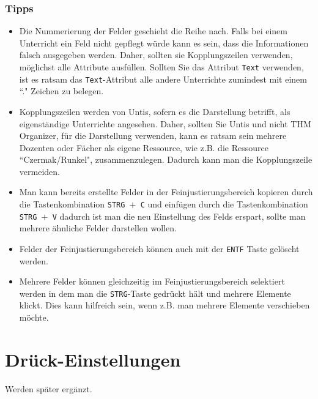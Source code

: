 \subsubsection{Tipps}

\begin{itemize}
	\item Die Nummerierung der Felder geschieht die Reihe nach. Falls bei einem Unterricht ein Feld nicht gepflegt würde kann es sein, dass die Informationen falsch ausgegeben werden. Daher, sollten sie Kopplungszeilen verwenden, möglichst alle Attribute ausfüllen. Sollten Sie das Attribut \texttt{Text} verwenden, ist es ratsam das \texttt{Text}-Attribut alle andere Unterrichte zumindest mit einem ``." \hspace{1pt} Zeichen zu belegen.
	\item Kopplungszeilen werden von Untis, sofern es die Darstellung betrifft, als eigenständige Unterrichte angesehen. Daher, sollten Sie Untis und nicht THM Organizer, für die Darstellung verwenden, kann es ratsam sein mehrere Dozenten oder Fächer als eigene Ressource, wie z.B. die Ressource ``Czermak/Runkel", zusammenzulegen. Dadurch kann man die Kopplungszeile vermeiden.
	\item Man kann bereits erstellte Felder in der Feinjustierungsbereich kopieren durch die Tastenkombination \texttt{STRG $+$ C} und einfügen durch die Tastenkombination \texttt{STRG $+$ V} dadurch ist man die neu Einstellung des Felds erspart, sollte man mehrere ähnliche Felder darstellen wollen.
	\item Felder der Feinjustierungsbereich können auch mit der \texttt{ENTF} Taste gelöscht werden.
	\item Mehrere Felder können gleichzeitig im Feinjustierungsbereich selektiert werden in dem man die \texttt{STRG}-Taste gedrückt hält und mehrere Elemente klickt. Dies kann hilfreich sein, wenn z.B. man mehrere Elemente verschieben möchte.
\end{itemize}



\section{Drück-Einstellungen}
\label{sec:druck-einstellungen}

Werden später ergänzt.